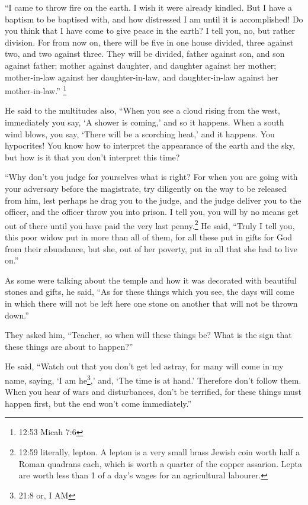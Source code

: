  ``I came to throw fire on the earth. I wish it were
already kindled.  But I have a baptism to be baptised with,
and how distressed I am until it is accomplished!  Do you
think that I have come to give peace in the earth? I tell you, no, but
rather division.  For from now on, there will be five in
one house divided, three against two, and two against three.
 They will be divided, father against son, and son against
father; mother against daughter, and daughter against her mother;
mother-in-law against her daughter-in-law, and daughter-in-law against
her mother-in-law.'' \footnote{12:53 Micah 7:6}

 He said to the multitudes also, ``When you see a cloud
rising from the west, immediately you say, `A shower is coming,' and so
it happens.  When a south wind blows, you say, `There will
be a scorching heat,' and it happens.  You hypocrites! You
know how to interpret the appearance of the earth and the sky, but how
is it that you don't interpret this time?

 ``Why don't you judge for yourselves what is right?
 For when you are going with your adversary before the
magistrate, try diligently on the way to be released from him, lest
perhaps he drag you to the judge, and the judge deliver you to the
officer, and the officer throw you into prison.  I tell
you, you will by no means get out of there until you have paid the very
last penny.\footnote{12:59 literally, lepton. A lepton is a very small
  brass Jewish coin worth half a Roman quadrans each, which is worth a
  quarter of the copper assarion. Lepta are worth less than 1 of a day's
  wages for an agricultural labourer.}  He said, ``Truly I
tell you, this poor widow put in more than all of them,  for
all these put in gifts for God from their abundance, but she, out of her
poverty, put in all that she had to live on.''

 As some were talking about the temple and how it was
decorated with beautiful stones and gifts, he said,  ``As
for these things which you see, the days will come in which there will
not be left here one stone on another that will not be thrown down.''

 They asked him, ``Teacher, so when will these things be?
What is the sign that these things are about to happen?''

 He said, ``Watch out that you don't get led astray, for
many will come in my name, saying, `I am he\footnote{21:8 or, I AM},'
and, `The time is at hand.' Therefore don't follow them. 
When you hear of wars and disturbances, don't be terrified, for these
things must happen first, but the end won't come immediately.''

